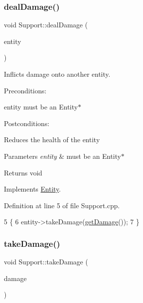 \subsubsection{\texorpdfstring{deal\+Damage()}{dealDamage()}}
{\footnotesize\ttfamily void Support\+::deal\+Damage (\begin{DoxyParamCaption}\item[{\hyperlink{classEntity}{Entity} $\ast$}]{entity }\end{DoxyParamCaption})\hspace{0.3cm}{\ttfamily [virtual]}}



Inflicts damage onto another entity. 

Preconditions\+:
\begin{DoxyItemize}
\item entity must be an Entity$\ast$
\end{DoxyItemize}

Postconditions\+:
\begin{DoxyItemize}
\item Reduces the health of the entity
\end{DoxyItemize}


\begin{DoxyParams}{Parameters}
{\em entity} & must be an Entity$\ast$ \\
\hline
\end{DoxyParams}
\begin{DoxyReturn}{Returns}
void 
\end{DoxyReturn}


Implements \hyperlink{classEntity}{Entity}.



Definition at line 5 of file Support.\+cpp.


\begin{DoxyCode}
5                                        \{
6     entity->takeDamage(\hyperlink{classEntity_ad38d4384aa0adef43443666a33f06508}{getDamage}());
7 \}
\end{DoxyCode}
\mbox{\label{classSupport_afb159bd8c474ec67ad5d03fa24c38564}} 
\subsubsection{\texorpdfstring{take\+Damage()}{takeDamage()}}
{\footnotesize\ttfamily void Support\+::take\+Damage (\begin{DoxyParamCaption}\item[{int}]{damage }\end{DoxyParamCaption})\hspace{0.3cm}{\ttfamily [virtual]}}



